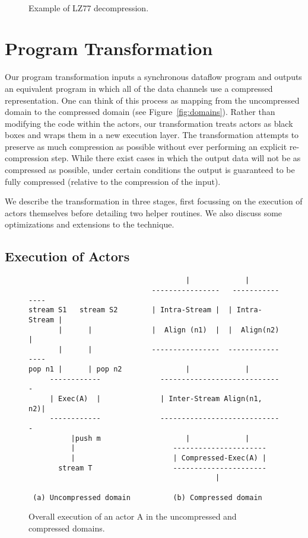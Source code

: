 \begin{figure}[t]
\begin{minipage}{0.21in}
\mbox{~}
\end{minipage}
\caption{Example of LZ77 decompression.
\protect\label{fig:lz77}}
\end{figure}

\section{Program Transformation}

Our program transformation inputs a synchronous dataflow program and
outputs an equivalent program in which all of the data channels use a
compressed representation.  One can think of this process as mapping
from the uncompressed domain to the compressed domain (see
Figure~\ref{fig:domains}).  Rather than modifying the code within the
actors, our transformation treats actors as black boxes and wraps them
in a new execution layer.  The transformation attempts to preserve as
much compression as possible without ever performing an explicit
re-compression step.  While there exist cases in which the output data
will not be as compressed as possible, under certain conditions the
output is guaranteed to be fully compressed (relative to the
compression of the input).

We describe the transformation in three stages, first focussing on the
execution of actors themselves before detailing two helper routines.
We also discuss some optimizations and extensions to the technique.

\subsection{Execution of Actors}

\begin{figure}[t]
\scriptsize
\begin{verbatim}
                                     |             |
                             ----------------   ---------------
stream S1   stream S2        | Intra-Stream |  | Intra-Stream |
       |      |              |  Align (n1)  |  |  Align(n2)   |
       |      |              ----------------  ----------------
pop n1 |      | pop n2               |             |
     ------------              -----------------------------
     | Exec(A)  |              | Inter-Stream Align(n1, n2)|
     ------------              -----------------------------
          |push m                    |             |
          |                       ----------------------
          |                       | Compressed-Exec(A) |
       stream T                   ----------------------
                                            |

 (a) Uncompressed domain          (b) Compressed domain
\end{verbatim}
\caption{Overall execution of an actor A in the uncompressed and compressed domains.
\protect\label{fig:actor-pic}}
\end{figure}

